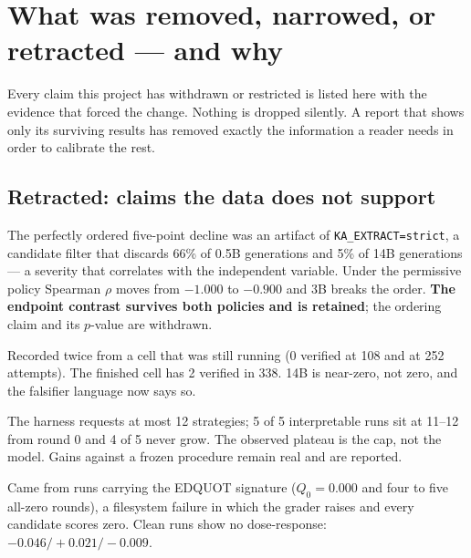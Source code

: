 \section{What was removed, narrowed, or retracted --- and why}
\label{sec:removed}

Every claim this project has withdrawn or restricted is listed here with the evidence that forced
the change. Nothing is dropped silently. A report that shows only its surviving results has
removed exactly the information a reader needs in order to calibrate the rest.

\subsection{Retracted: claims the data does not support}

\begin{description}[leftmargin=1.4em,style=nextline]
\item[{T1-kernel monotone ordering ($p = 1/120$).}]
  The perfectly ordered five-point decline was an artifact of \texttt{KA\_EXTRACT=strict}, a
  candidate filter that discards 66\% of 0.5B generations and 5\% of 14B generations --- a
  severity that correlates with the independent variable. Under the permissive policy Spearman
  $\rho$ moves from $-1.000$ to $-0.900$ and 3B breaks the order. \textbf{The endpoint contrast
  survives both policies and is retained}; the ordering claim and its $p$-value are withdrawn.

\item[{T1-kernel ``14B verifies nothing''.}]
  Recorded twice from a cell that was still running (0 verified at 108 and at 252 attempts). The
  finished cell has 2 verified in 338. 14B is near-zero, not zero, and the falsifier language now
  says so.

\item[{T3 ``frontier self-modification is one-shot''.}]
  The harness requests at most 12 strategies; 5 of 5 interpretable runs sit at 11--12 from round
  0 and 4 of 5 never grow. The observed plateau is the cap, not the model. Gains against a frozen
  procedure remain real and are reported.

\item[{T3 cap dose-response ($+0.482$ at unbounded).}]
  Came from runs carrying the EDQUOT signature ($Q_0 = 0.000$ and four to five all-zero rounds), a
  filesystem failure in which the grader raises and every candidate scores zero. Clean runs show
  no dose-response: $-0.046 / +0.021 / -0.009$.


\end{description}
